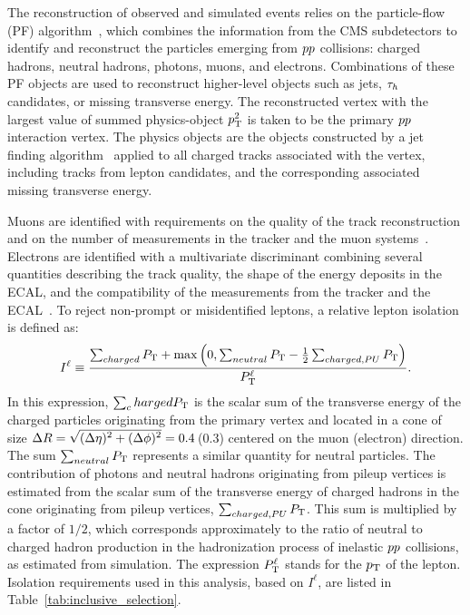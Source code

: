 The reconstruction of observed and simulated events relies on the particle-flow (PF) algorithm~\cite{Sirunyan:2017ulk},
which combines the information from the CMS subdetectors to identify
and reconstruct the particles emerging from $pp$ collisions:
charged hadrons, neutral hadrons, photons, muons, and electrons.
Combinations of these PF objects are used to reconstruct
higher-level objects such as jets, $\tau_{h}$ candidates, or
missing transverse energy.
The reconstructed vertex with the largest value of summed physics-object $p_\mathrm{T}^2$ is taken to be the primary $pp$ interaction vertex. The physics objects are the objects constructed by a jet finding algorithm~\cite{Cacciari:2008gp,Cacciari:2011ma} applied to all charged tracks associated with the vertex, including tracks from lepton candidates, and the corresponding associated missing transverse energy.

Muons are identified with requirements on the quality of
the track reconstruction and on the number of measurements in the
tracker and the muon systems~\cite{Chatrchyan:2012xi}.
Electrons are identified with a multivariate discriminant
combining several quantities describing the track quality,
the shape of the energy deposits in the ECAL,
and the compatibility of the measurements from the tracker and the
ECAL~\cite{Khachatryan:2015hwa}.
To reject non-prompt or misidentified leptons, a relative lepton isolation is defined as:
\begin{equation}
I^{\ell} \equiv \frac{\sum_{charged}  P_\mathrm{T} + \max\left( 0, \sum_{neutral}  P_\mathrm{T}
                                         - \frac{1}{2} \sum_{charged, PU} P_\mathrm{T}  \right )}{P_\mathrm{T}^{\ell}}.
\label{eq:reconstruction_isolation}
\end{equation}
In this expression, $\sum_charged  P_\mathrm{T}$ is the scalar sum of the
transverse energy of the charged particles originating from
the primary vertex and located in a cone of size
$\Delta R = \sqrt{\smash[b]{(\Delta \eta)^2 + (\Delta \phi)^2}} = 0.4$\,(0.3)
centered on the muon (electron) direction. The sum
$\sum_{neutral}  P_\mathrm{T}$  represents
a similar quantity for neutral particles.
The contribution of photons and neutral hadrons originating from pileup vertices is estimated from the scalar sum of the transverse
energy of charged hadrons in the cone originating from pileup vertices,
$\sum_{charged, PU} P_\mathrm{T}$. This sum is multiplied by a factor of
$1/2$, which corresponds approximately to the ratio of neutral to charged
hadron production in the hadronization process
of inelastic $pp$ collisions, as estimated from simulation.
The expression $P_\mathrm{T}^{\ell}$ stands for the $p_\mathrm{T}$ of the lepton. Isolation requirements used in this analysis, based on $I^{\ell}$, are listed in Table~\ref{tab:inclusive_selection}.

